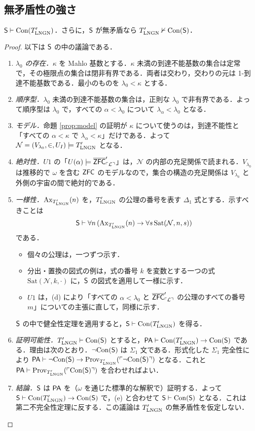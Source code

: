 \subsection{無矛盾性の強さ}
\begin{theorem}\label{thm:con}
$\mathsf{S}\vdash\mathrm{Con}(T'_{\mathrm{LNGN}})$．さらに，$\mathsf{S}$ が無矛盾なら $T'_{\mathrm{LNGN}}\nvdash\mathrm{Con}(\mathsf{S})$．
\end{theorem}
\begin{proof}
以下は $\mathsf{S}$ の中の議論である．
\begin{enumerate}[label=(\alph*)]
\item \emph{$\lambda_0$ の存在．}$\kappa$ を Mahlo 基数とする．$\kappa$ 未満の到達不能基数の集合は定常で，その極限点の集合は閉非有界である．両者は交わり，交わりの元は 1-到達不能基数である．最小のものを $\lambda_0<\kappa$ とする．
\item \emph{順序型．}$\lambda_0$ 未満の到達不能基数の集合は，正則な $\lambda_0$ で非有界である．よって順序型は $\lambda_0$ で，すべての $\alpha<\lambda_0$ について $\lambda_\alpha<\lambda_0$ となる．
\item \emph{モデル．}命題 \ref{prop:model} の証明が $\kappa$ について使うのは，到達不能性と「すべての $\alpha<\kappa$ で $\lambda_\alpha<\kappa$」だけである．よって $\mathcal N=(V_{\lambda_0},\in,U_I)\models T'_{\mathrm{LNGN}}$ となる．
\item \emph{絶対性．}$U1$ の「$U(\alpha)\models\overline{\mathsf{ZFC}}_{\ulcorner\mathcal{L}\urcorner}'$」は，$\mathcal N$ の内部の充足関係で読まれる．$V_{\lambda_0}$ は推移的で $\omega$ を含む $\mathsf{ZFC}$ のモデルなので，集合の構造の充足関係は $V_{\lambda_0}$ と外側の宇宙の間で絶対的である．
\item \emph{一様性．}$\mathrm{Ax}_{T'_{\mathrm{LNGN}}}(n)$ を，$T'_{\mathrm{LNGN}}$ の公理の番号を表す $\Delta_1$ 式とする．示すべきことは
\[ \mathsf{S}\vdash\forall n\,(\mathrm{Ax}_{T'_{\mathrm{LNGN}}}(n)\to\forall s\,\mathrm{Sat}(\mathcal N,n,s)) \]
である．
\begin{itemize}
\item 個々の公理は，一つずつ示す．
\item 分出・置換の図式の例は，式の番号 $k$ を変数とする一つの式 $\mathrm{Sat}(\mathcal N,k,\cdot)$ に，$\mathsf{S}$ の図式を適用して一様に示す．
\item $U1$ は，(d) により「すべての $\alpha<\lambda_0$ と $\overline{\mathsf{ZFC}}_{\ulcorner\mathcal{L}\urcorner}'$ の公理のすべての番号 $m$」についての主張に直して，同様に示す．
\end{itemize}
$\mathsf{S}$ の中で健全性定理を適用すると，$\mathsf{S}\vdash\mathrm{Con}(T'_{\mathrm{LNGN}})$ を得る．
\item \emph{証明可能性．}$T'_{\mathrm{LNGN}}\vdash\mathrm{Con}(\mathsf{S})$ とすると，$\mathsf{PA}\vdash\mathrm{Con}(T'_{\mathrm{LNGN}})\to\mathrm{Con}(\mathsf{S})$ である．理由は次のとおり．$\neg\mathrm{Con}(\mathsf{S})$ は $\Sigma_1$ 文である．形式化した $\Sigma_1$ 完全性により $\mathsf{PA}\vdash\neg\mathrm{Con}(\mathsf{S})\to\mathrm{Prov}_{T'_{\mathrm{LNGN}}}(\ulcorner\neg\mathrm{Con}(\mathsf{S})\urcorner)$ となる．これと $\mathsf{PA}\vdash\mathrm{Prov}_{T'_{\mathrm{LNGN}}}(\ulcorner\mathrm{Con}(\mathsf{S})\urcorner)$ を合わせればよい．
\item \emph{結論．}$\mathsf{S}$ は $\mathsf{PA}$ を（$\omega$ を通じた標準的な解釈で）証明する．よって $\mathsf{S}\vdash\mathrm{Con}(T'_{\mathrm{LNGN}})\to\mathrm{Con}(\mathsf{S})$ で，(e) と合わせて $\mathsf{S}\vdash\mathrm{Con}(\mathsf{S})$ となる．これは第二不完全性定理に反する．この議論は $T'_{\mathrm{LNGN}}$ の無矛盾性を仮定しない．
\end{enumerate}
\end{proof}

